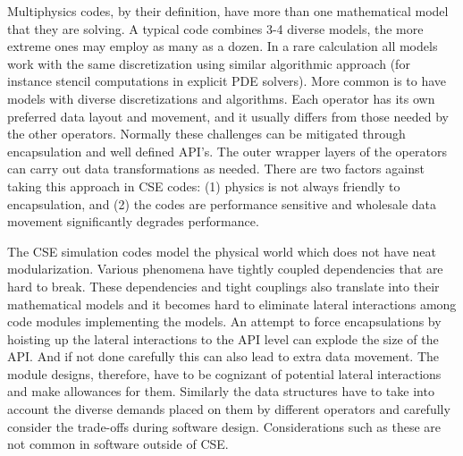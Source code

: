 \label{sec:domainChallenges}
Multiphysics codes, by their definition, have more than one
mathematical model that they are solving. A typical code combines 3-4
diverse models, the more extreme ones may employ as many as a
dozen. In a rare calculation all models work with the same
discretization using similar algorithmic approach (for instance
stencil computations in explicit PDE solvers). More common is to have
models with diverse discretizations and algorithms. Each operator has
its own preferred data layout and  movement, and it usually differs
from those needed by the other operators.  Normally these challenges
can be mitigated through encapsulation and well defined API's. The outer
wrapper layers of the operators can carry out data transformations as
needed. There are two factors against taking this approach in CSE
codes: (1) physics is not always friendly to encapsulation, and (2)
the codes are performance sensitive and wholesale data movement
significantly degrades performance. 

The CSE simulation codes model the physical world which does not
have neat modularization. Various phenomena have tightly coupled
dependencies that are hard to break. These dependencies and tight
couplings also translate into their mathematical models and it becomes
hard to eliminate lateral interactions among code modules implementing
the models. An attempt to force encapsulations by hoisting up the
lateral interactions to the API level can explode the size of the
API. And if not done carefully this can also lead to extra data
movement. The module designs, therefore, have to be cognizant of
potential lateral interactions and make allowances for them.
Similarly the data structures have to take into account the diverse
demands placed on them by different operators and carefully consider
the trade-offs during software design. Considerations such as these
are not common in software outside of CSE.  



